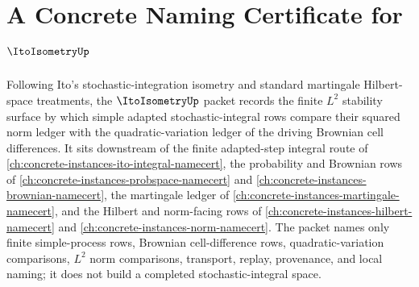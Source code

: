 \chapter{A Concrete Naming Certificate for $\ItoIsometryUp$}
\label{ch:concrete-instances-ito-isometry-namecert}

Following Ito's stochastic-integration isometry and standard martingale Hilbert-space treatments, the $\ItoIsometryUp$ packet records the finite $L^2$ stability surface by which simple adapted stochastic-integral rows compare their squared norm ledger with the quadratic-variation ledger of the driving Brownian cell differences. It sits downstream of the finite adapted-step integral route of \autoref{ch:concrete-instances-ito-integral-namecert}, the probability and Brownian rows of \autoref{ch:concrete-instances-probspace-namecert} and \autoref{ch:concrete-instances-brownian-namecert}, the martingale ledger of \autoref{ch:concrete-instances-martingale-namecert}, and the Hilbert and norm-facing rows of \autoref{ch:concrete-instances-hilbert-namecert} and \autoref{ch:concrete-instances-norm-namecert}. The packet names only finite simple-process rows, Brownian cell-difference rows, quadratic-variation comparisons, $L^2$ norm comparisons, transport, replay, provenance, and local naming; it does not build a completed stochastic-integral space.

